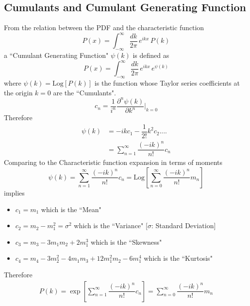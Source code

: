 \documentclass[aps,prb,onecolumn,notitlepage,showpacs,floatfix,superscriptaddress]{revtex4-1}
\newcommand{\mrm}[1]{\mathrm{#1}}
\begin{document}
\subsection*{Cumulants and Cumulant Generating Function}
From the relation between the PDF and the characteristic function
\begin{equation}
P(x) = \int_{-\infty}^{\infty} \dfrac{dk}{2\pi} \, e^{ikx} \, P(k) 
\end{equation} 
a ``Cumulant Generating Function" $\psi(k)$ is defined as 
\begin{equation}
P(x) = \int_{-\infty}^{\infty} \dfrac{dk}{2\pi} \, e^{ikx} \, e^{\psi(k)}
\end{equation} 
where $\psi(k) = \mrm{Log}[P(k)]$ is the function whose Taylor series coefficients at the origin $k=0$ are the ``Cumulants".
\begin{equation}
c_n = \dfrac{1}{i^n} \dfrac{\partial^n \psi(k)}{\partial k^n} \bigg\vert_{k=0} 
\end{equation}
Therefore
\begin{equation}
\begin{split}
\psi(k) &= -i k c_1 -\dfrac{1}{2!} k^2 c_2 .... \\
&= \sum_{n=1}^{\infty} \dfrac{(-i k)^n}{n!} c_n
\end{split}
\end{equation}
Comparing to the Characteristic function expansion in terms of moments
\begin{equation}
\psi(k) =  \sum_{n=1}^{\infty} \dfrac{(-i k)^n}{n!} c_n = \mrm{Log} \left[  \sum_{n=0}^{\infty} \dfrac{(-i k)^n}{n!} m_n \right]
\end{equation}
implies
\begin{itemize}
\item $c_1 = m_1$ which is the ``Mean"
\item $c_2 = m_2 - m_1^2 = \sigma^2$ which is the ``Variance" [$\sigma$: Standard Deviation]
\item $c_3 = m_3 -3 m_1 m_2 +2 m_1^3$ which is the ``Skewness"
\item $c_4 = m_4 -3 m_2^2 -4 m_1 m_3 + 12 m_1^2 m_2 -6 m_1^4$ which is the ``Kurtosis"
\end{itemize}
Therefore
\begin{equation}
\begin{split}
P(k) = \exp \left[ \sum_{n=1}^{\infty} \dfrac{(-i k)^n}{n!} c_n \right] = \sum_{n=0}^{\infty} \dfrac{(-i k)^n}{n!} m_n 
\end{split}
\end{equation}
\end{document}
